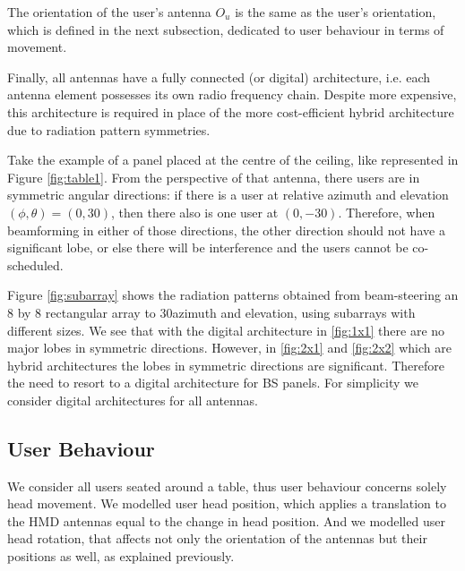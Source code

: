 
The orientation of the user's antenna $O_{u}$ is the same as the user's orientation, which is defined in the next subsection, dedicated to user behaviour in terms of movement.

Finally, all antennas have a fully connected (or digital) architecture, i.e. each antenna element possesses its own radio frequency chain. Despite more expensive, this architecture is required in place of the more cost-efficient hybrid architecture due to radiation pattern symmetries.

Take the example of a panel placed at the centre of the ceiling, like represented in Figure \ref{fig:table1}. From the perspective of that antenna, there users are in symmetric angular directions: if there is a user at relative azimuth and elevation $(\phi, \theta) = (0, 30)$, then there also is one user at $(0, -30)$. Therefore, when beamforming in either of those directions, the other direction should not have a significant lobe, or else there will be interference and the users cannot be co-scheduled. 

Figure \ref{fig:subarray} shows the radiation patterns obtained from beam-steering an 8 by 8 rectangular array to 30\tdeg azimuth and \tdeg elevation, using subarrays with different sizes. We see that with the digital architecture in \ref{fig:1x1} there are no major lobes in symmetric directions. However, in \ref{fig:2x1} and \ref{fig:2x2} which are hybrid architectures the lobes in symmetric directions are significant. Therefore the need to resort to a digital architecture for \ac{BS} panels. For simplicity we consider digital architectures for all antennas.



\subsection{User Behaviour}

We consider all users seated around a table, thus user behaviour concerns solely head movement. We modelled user head position, which applies a translation to the \ac{HMD} antennas equal to the change in head position. And we modelled user head rotation, that affects not only the orientation of the antennas but their positions as well, as explained previously.


